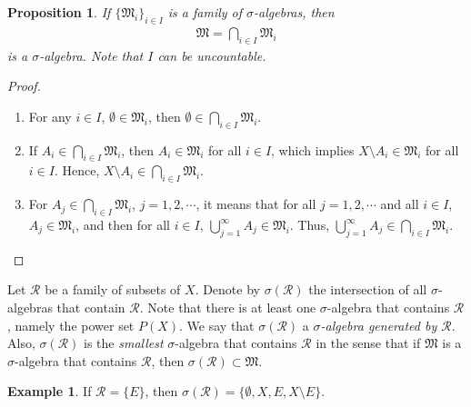 \documentclass[11pt]{book}
\newtheorem{proposition}{Proposition}[chapter]
\theoremstyle{definition}
\newtheorem{example}{Example}[chapter]
\numberwithin{equation}{chapter}
\def\MM{\mathfrak{M}}
\begin{document}
\begin{proposition}
If $\{\MM_i\}_{i\in I}$ is a family of $\sigma$-algebras, then
\begin{align*}
    \MM = \bigcap_{i \in I} \MM_i
\end{align*}
is a $\sigma$-algebra. Note that $I$ can be uncountable.
\end{proposition}
\begin{proof}
~\begin{enumerate}[label=(\alph*)]
    \item For any $i \in I$, $\emptyset \in \MM_i$, then $\emptyset \in \bigcap_{i \in I} \MM_i$.
    
    \item If $A_i \in \bigcap_{i \in I} \MM_i$, then $A_i \in \MM_i$ for all $i \in I$, which implies $X\setminus A_i \in \MM_i$ for all $i \in I$. Hence, $X\setminus A_i \in \bigcap_{i \in I} \MM_i$.
    
    \item For $A_j \in \bigcap_{i \in I} \MM_i$, $j = 1, 2, \cdots$, it means that for all $j = 1, 2, \cdots$ and all $i \in I$, $A_j \in \MM_i$, and then for all $i \in I$, $\bigcup^\infty_{j=1} A_j \in \MM_i$. Thus, $\bigcup^\infty_{j=1} A_j \in \bigcap_{i \in I} \MM_i$.
\end{enumerate}

\end{proof}


\medskip

Let $\mathcal{R}$ be a family of subsets of $X$. Denote by $\sigma(\mathcal{R})$ the intersection of all $\sigma$-algebras that contain $\mathcal{R}$. Note that there is at least one $\sigma$-algebra that contains $\mathcal{R}$, namely the power set $P(X)$. We say that $\sigma(\mathcal{R})$ a {\em $\sigma$-algebra generated by $\mathcal{R}$}. Also, $\sigma(\mathcal{R})$ is the {\em smallest} $\sigma$-algebra that contains $\mathcal{R}$ in the sense that if $\MM$ is a $\sigma$-algebra that contains $\mathcal{R}$, then $\sigma(\mathcal{R}) \subset \MM$.

\medskip

\begin{example}
If $\mathcal{R} = \{E\}$, then $\sigma(\mathcal{R}) = \{\emptyset, X, E, X\setminus E\}$.
\end{example}

\medskip
\end{document}

